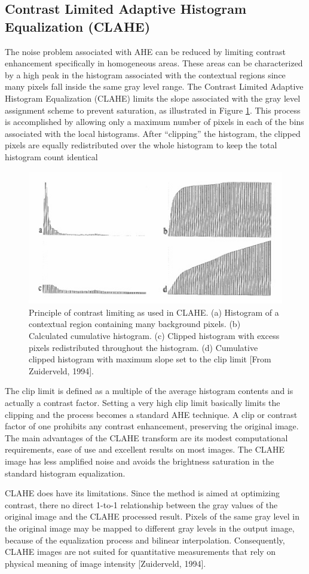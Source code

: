 \subsection{Contrast Limited Adaptive Histogram Equalization (CLAHE)}
The noise problem associated with AHE can be reduced by limiting
contrast enhancement specifically in homogeneous areas. These areas can be
characterized by a high peak in the histogram associated with the contextual
regions since many pixels fall inside the same gray level range. The Contrast
Limited Adaptive Histogram Equalization (CLAHE) limits the slope associated
with the gray level assignment scheme to prevent saturation, as illustrated in
Figure \ref{CLAHE}. This process is accomplished by allowing only a maximum number of
pixels in each of the bins associated with the local histograms. After “clipping” the
histogram, the clipped pixels are equally redistributed over the whole histogram
to keep the total histogram count identical
\begin{figure}
	\centering
	\includegraphics[scale=1]{images/ch3/CLAHE.jpg}
	\caption{Principle of contrast limiting as used in CLAHE. (a)
Histogram of a contextual region containing many background pixels.
(b) Calculated cumulative histogram. (c) Clipped histogram with excess
pixels redistributed throughout the histogram. (d) Cumulative clipped
histogram with maximum slope set to the clip limit [From Zuiderveld,
1994].}
\label{CLAHE}
\end{figure}

The clip limit is defined as a multiple of the average histogram contents
and is actually a contrast factor. Setting a very high clip limit basically limits the clipping and the process becomes a standard AHE technique. A clip or contrast
factor of one prohibits any contrast enhancement, preserving the original image.
The main advantages of the CLAHE transform are its modest
computational requirements, ease of use and excellent results on most images. The CLAHE image has less amplified noise and avoids the brightness saturation in the standard histogram equalization.

CLAHE does have its limitations. Since the method is aimed at optimizing
contrast, there no direct 1-to-1 relationship between the gray values of the
original image and the CLAHE processed result. Pixels of the same gray level in
the original image may be mapped to different gray levels in the output image,
because of the equalization process and bilinear interpolation. Consequently,
CLAHE images are not suited for quantitative measurements that rely on
physical meaning of image intensity [Zuiderveld, 1994].

